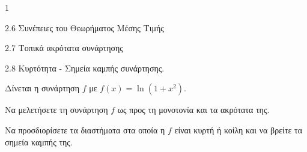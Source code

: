 \begin{ylh}{1}
    \item 2.6 Συνέπειες του Θεωρήματος Μέσης Τιμής
    \item 2.7 Τοπικά ακρότατα συνάρτησης
    \item 2.8 Κυρτότητα - Σημεία καμπής συνάρτησης.
\end{ylh}
Δίνεται η συνάρτηση $f$ με $f(x) = \ln(1 + x^2)$.
\begin{alist}
\item Να μελετήσετε τη συνάρτηση $f$ ως προς τη μονοτονία και τα ακρότατα της. 
\item Να προσδιορίσετε τα διαστήματα στα οποία η $f$ είναι κυρτή ή κοίλη και να βρείτε τα σημεία καμπής της. 
\end{alist}